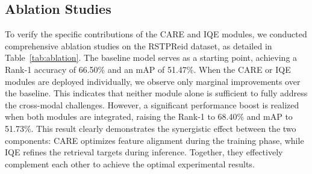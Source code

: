 \documentclass{article}
\begin{document}
\subsection{Ablation Studies}

To verify the specific contributions of the CARE and IQE modules, we conducted comprehensive ablation studies on the RSTPReid dataset, as detailed in Table~\ref{tab:ablation}. The baseline model serves as a starting point, achieving a Rank-1 accuracy of 66.50\% and an mAP of 51.47\%. When the CARE or IQE modules are deployed individually, we observe only marginal improvements over the baseline. This indicates that neither module alone is sufficient to fully address the cross-modal challenges. However, a significant performance boost is realized when both modules are integrated, raising the Rank-1 to 68.40\% and mAP to 51.73\%. This result clearly demonstrates the synergistic effect between the two components: CARE optimizes feature alignment during the training phase, while IQE refines the retrieval targets during inference. Together, they effectively complement each other to achieve the optimal experimental results.


\begin{table}[t]
\centering
\caption{Ablation study of CONQUER components on RSTPReid.}
\label{tab:ablation}
\end{table}


\vspace{-1em}
\end{document}
